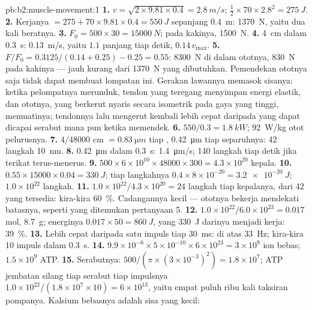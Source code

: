 \begin{solution}{pb:b2:muscle-movement:1}
\textbf{1.} $v = \sqrt{2\times 9.81\times 0.4} = \qty{2.8}{m/s}$;
$\tfrac12\times 70\times 2.8^{2} = \qty{275}{J}$.
\textbf{2.} Kerjanya $= 275 + 70\times 9.81\times 0.4 = \qty{550}{J}$ sepanjang
\qty{0.4}{m}: \qty{1370}{N}, yaitu dua kali beratnya.
\textbf{3.} $F_0 = 500\times 30 = \qty{15000}{N}$; pada kakinya,
\qty{1500}{N}.
\textbf{4.} \qty{4}{cm} dalam \qty{0.3}{s}: \qty{0.13}{m/s}, yaitu $1.1$ panjang tiap
detik, $0.14\,v_{\max}$.
\textbf{5.} $F/F_0 = 0.3125/(0.14 + 0.25) - 0.25 = 0.55$: \qty{8300}{N}
di dalam ototnya, \qty{830}{N} pada kakinya --- jauh kurang dari
\qty{1370}{N} yang dibutuhkan. Pemendekan ototnya saja tidak dapat
membuat lompatan ini. Gerakan lawannya memasok sisanya: ketika
pelompatnya merunduk, tendon yang teregang menyimpan energi elastik,
dan ototnya, yang berkerut nyaris secara isometrik pada gaya yang
tinggi, memuatinya; tendonnya lalu mengerut kembali lebih cepat
daripada yang dapat dicapai serabut mana pun ketika memendek.
\textbf{6.} $550/0.3 = \qty{1.8}{kW}$; \qty{92}{W/kg} otot pelurusnya.
\textbf{7.} $4/\num{48000}$ cm $= \qty{0.83}{\micro m}$ tiap ,
\qty{0.42}{\micro m} tiap separuhnya: 42 langkah \qty{10}{nm}.
\textbf{8.} \qty{0.42}{\micro m} dalam \qty{0.3}{s}: \qty{1.4}{\micro m/s};
140 langkah tiap detik jika terikat terus-menerus.
\textbf{9.} $500\times 6\times 10^{10}\times \num{48000}\times 300 =
4.3\times 10^{20}$ kepala.
\textbf{10.} $0.55\times \num{15000}\times 0.04 = \qty{330}{J}$; tiap
langkahnya $0.4\times 8\times 10^{-20} = \qty{3.2e-20}{J}$; $1.0\times
10^{22}$ langkah.
\textbf{11.} $1.0\times 10^{22}/4.3\times 10^{20} = 24$ langkah tiap
kepalanya, dari 42 yang tersedia: kira-kira \qty{60}{\%}. Cadangannya
kecil --- ototnya bekerja mendekati batasnya, seperti yang ditemukan
pertanyaan 5.
\textbf{12.} $1.0\times 10^{22}/6.0\times 10^{23} = 0.017$ mol,
\qty{8.7}{g}; energinya $0.017\times 50 = \qty{860}{J}$, yang
\qty{330}{J} darinya menjadi kerja: \qty{39}{\%}.
\textbf{13.} Lebih cepat daripada satu impuls tiap \qty{30}{ms}: di
atas \qty{33}{Hz}; kira-kira 10 impuls dalam \qty{0.3}{s}.
\textbf{14.} $9.9\times 10^{-6}\times 5\times 10^{-10}\times 6\times
10^{23} = 3\times 10^{9}$ ion bebas; $1.5\times 10^{9}$ ATP.
\textbf{15.} Serabutnya: $500/(\pi\times(3\times 10^{-3})^{2}) = 1.8\times
10^{7}$; ATP jembatan silang tiap serabut tiap impulsnya $1.0\times
10^{22}/(1.8\times 10^{7}\times 10) = 6\times 10^{13}$, yaitu empat puluh ribu
kali taksiran pompanya. Kalsium bebasnya adalah sisa yang kecil:

\end{solution}
